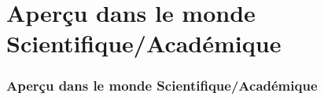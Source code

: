 
\section{Aperçu dans le monde Scientifique/Académique}

\begin{frame}
    \frametitle{Aperçu dans le monde Scientifique/Académique}
\end{frame}
